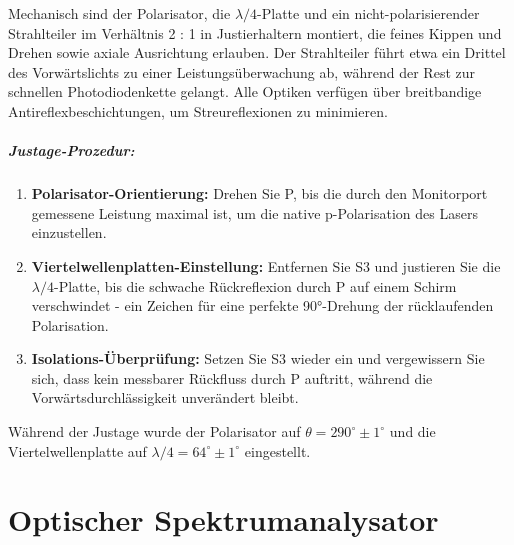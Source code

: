 Mechanisch sind der Polarisator, die $\lambda/4$-Platte und ein nicht-polarisierender Strahlteiler im Verhältnis 2 : 1 in Justierhaltern montiert, die feines Kippen und Drehen sowie axiale Ausrichtung erlauben. 
Der Strahlteiler führt etwa ein Drittel des Vorwärtslichts zu einer Leistungsüberwachung ab, während der Rest zur schnellen Photodiodenkette gelangt. Alle Optiken verfügen über breitbandige Antireflexbeschichtungen, um Streureflexionen zu minimieren.

\paragraph{Justage-Prozedur:}
\begin{enumerate}
  \item \textbf{Polarisator-Orientierung:} Drehen Sie P, bis die durch den Monitorport gemessene Leistung maximal ist, um die native p-Polarisation des Lasers einzustellen.
  \item \textbf{Viertelwellenplatten-Einstellung:} Entfernen Sie S3 und justieren Sie die $\lambda/4$-Platte, bis die schwache Rückreflexion durch P auf einem Schirm verschwindet - ein Zeichen für eine perfekte 90°-Drehung der rücklaufenden Polarisation.
  \item \textbf{Isolations-Überprüfung:} Setzen Sie S3 wieder ein und vergewissern Sie sich, dass kein messbarer Rückfluss durch P auftritt, während die Vorwärtsdurchlässigkeit unverändert bleibt.  
\end{enumerate}
Während der Justage wurde der Polarisator auf $\theta = 290^\circ \pm 1^\circ$ und die Viertelwellenplatte auf $\lambda/4 = 64^\circ \pm 1^\circ$ eingestellt.


\chapter{Optischer Spektrumanalysator} \label{sec:5.7}

